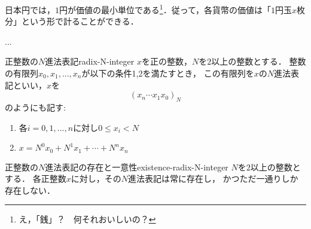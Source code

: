 \documentclass[a5j, uplatex, dvipdfmx]{jsbook}
\begin{document}
    日本円では，$1$円が価値の最小単位である\footnote{
        え，「銭」？　何それおいしいの？
    }．従って，各貨幣の価値は「$1$円玉$x$枚分」という形で計ることができる．

    ...

    \begin{dfn}{正整数の$N$進法表記}{radix-N-integer}
        $x$を正の整数，$N$を$2$以上の整数とする．
        整数の有限列$x_0, x_1, ..., x_n$が以下の条件1,2を満たすとき，
        この有限列を$x$の$N$進法表記といい，$x$を
        \begin{equation*}
            (x_n \cdots x_1 x_0)_N
        \end{equation*}
        のようにも記す:
        \begin{enumerate}
            \item 各$i = 0,1,...,n$に対し$0 \leq x_i < N$
            \item $x = N^0 x_0 + N^1 x_1 + \cdots + N^n x_n$
        \end{enumerate}
    \end{dfn}

    \begin{thm}{正整数の$N$進法表記の存在と一意性}{existence-radix-N-integer}
        $N$を$2$以上の整数とする．
        各正整数$x$に対し，その$N$進法表記は常に存在し，
        かつただ一通りしか存在しない．
    \end{thm}
\end{document}
